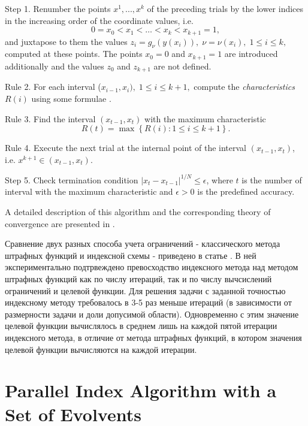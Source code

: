 \documentclass[smallextended]{svjour3}       %
\begin{document}
Step 1. Renumber the points $x^1,...,x^k$ of the preceding trials by the lower indices in the increasing order of the coordinate values, i.e.
\[
0=x_0<x_1<\dots <x_k<x_{k+1}=1,
\]
and juxtapose to them the values $z_i=g_\nu(y(x_i)), \; \nu=\nu(x_i), \; 1 \leq i \leq k,$ computed at these points. The points $x_0=0$ and $x_{k+1}=1$ are introduced additionally and the values $z_0$ and $z_{k+1}$ are not defined.

Rule 2. For each interval ($x_{i-1},x_i), \; 1 \leq i \leq k+1,$ compute the \textit{characteristics} $R(i)$ using some formulae \cite{Barkalov2002}.

Rule 3. Find the interval $(x_{t-1},x_t)$ with the maximum characteristic
\begin{equation}\label{MaxR}
R(t)=\max{\left\{R(i): 1 \leq i \leq k+1\right\}}.
\end{equation}

Rule 4. Execute the next trial at the internal point of the interval $(x_{t-1},x_t)$, i.e. $x^{k+1} \in (x_{t-1},x_t)$.

Step 5. Check termination condition $\left|x_t-x_{t-1}\right|^{1/N}\leq \epsilon$, where $t$ is the number of interval with the maximum characteristic and $\epsilon > 0$ is the predefined accuracy.

A detailed description of this algorithm and the corresponding theory of convergence are presented in \cite{Strongin2000,Sergeyev2001,Barkalov2002}.

\Russian
Сравнение двух разных способа учета ограничений - классического метода штрафных функций и индексной схемы - приведено в статье \cite{Barkalov2017}. В ней экспериментально подтрвеждено превосходство индексного метода над методом штрафных функций как по числу итераций, так и по числу вычсислений ограничений и целевой функции. Для решения задачи с заданной точностью индексному методу требовалось в 3-5 раз меньше итераций (в зависимости от размерности задачи и доли допусимой области). Одновременно с этим значение целевой функции вычислялось в среднем лишь на каждой пятой итерации индексного метода, в отличие от метода штрафных функций, в котором значения целевой функции вычисляются на каждой итерации.


\section{Parallel Index Algorithm with a Set of Evolvents}
\label{sec:3}
\end{document}

